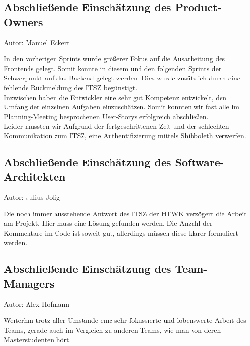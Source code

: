\subsection{Abschließende Einschätzung des Product-Owners}
{\small Autor: Manuel Eckert}

In den vorherigen Sprints wurde größerer Fokus auf die Ausarbeitung des Frontends gelegt. Somit konnte in diesem und den folgenden Sprints der Schwerpunkt auf das Backend gelegt werden. Dies wurde zusätzlich durch eine fehlende Rückmeldung des ITSZ begünstigt. \\
Inzwischen haben die Entwickler eine sehr gut Kompetenz entwickelt, den Umfang der einzelnen Aufgaben einzuschätzen. Somit konnten wir fast alle im Planning-Meeting besprochenen User-Storys erfolgreich abschließen. \\
Leider mussten wir Aufgrund der fortgeschrittenen Zeit und der schlechten Kommunikation zum ITSZ, eine Authentifizierung mittels Shibboleth verwerfen.   

\subsection{Abschließende Einschätzung des Software-Architekten}
{\small Autor: Julius Jolig}

Die noch immer ausstehende Antwort des ITSZ der HTWK verzögert die Arbeit am Projekt. Hier muss eine Lösung gefunden werden. Die Anzahl der Kommentare im Code ist soweit gut, allerdings müssen diese klarer formuliert werden. 

\subsection{Abschließende Einschätzung des Team-Managers}
{\small Autor: Alex Hofmann}

Weiterhin trotz aller Umstände eine sehr fokussierte und lobenswerte Arbeit des Teams, gerade auch im Vergleich zu anderen Teams, wie man von deren Masterstudenten hört.

